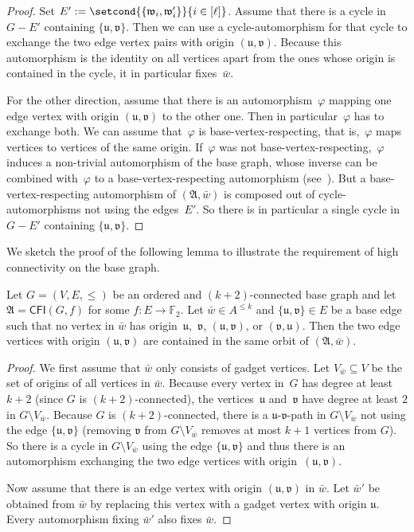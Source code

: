 \documentclass[]{lmcs}
\renewcommand{\phi}{\varphi}
\newcommand{\FF}{\mathbb{F}}
\newcommand{\set}[1]{\lbrace #1 \rbrace}
\newcommand{\autoA}{\phi}
\newcommand{\tup}[1]{\bar{#1}}
\newcommand{\Struct}{\mathfrak{A}}
\newcommand{\vertC}{w}
\newcommand{\StructA}{\mathfrak{A}}
\newcommand{\StructVA}{A}
\newcommand{\CFIsym}{\mathsf{CFI}}
\newcommand{\CFI}[1]{\CFIsym(#1)}
\newcommand{\bVertA}{\mathfrak{u}}
\newcommand{\bVertB}{\mathfrak{v}}
\newcommand{\bVertC}{\mathfrak{w}}
\begin{document}
\begin{proof}
	Set $E' := \setcond{\set{\bVertC_i,\bVertC'_i}}{i \in [\ell]}$.
	Assume that there is a cycle in $G -E'$
	containing $\set{\bVertA,\bVertB}$.
	Then we can use a cycle-automorphism for that cycle
	to exchange the two edge vertex pairs with origin $(\bVertA,\bVertB)$.
	Because this automorphism is the identity on all vertices apart from the ones whose origin is contained in the cycle,
	it in particular fixes~$\tup{\vertC}$.
	
	For the other direction, assume that there is an automorphism~$\autoA$ mapping
	one edge vertex with origin $(\bVertA,\bVertB)$ to the other one.
	Then in particular~$\autoA$ has to exchange both.
	We can assume that~$\autoA$ is base-vertex-respecting,
	that is,~$\autoA$ maps vertices to vertices of the same origin.
	If~$\autoA$ was not base-vertex-respecting,~$\autoA$ induces
	a non-trivial automorphism of the base graph,
	whose inverse can be combined with~$\autoA$ to a base-vertex-respecting automorphism (see~\cite{Pago23}).
	But a base-vertex-respecting automorphism of $(\StructA, \tup{\vertC})$ is composed out of cycle-automorphisms
	not using the edges~$E'$.
	So there is in particular a single cycle in $G -E'$ containing $\set{\bVertA,\bVertB}$.
\end{proof}
We sketch the proof of the following lemma
to illustrate the requirement of high connectivity on the base graph.

\begin{lemC}
	\label{lem:orbits-connectivity}
	Let $G=(V,E,\leq)$ be an ordered and $(k+2)$-connected base graph
	and let $\StructA = \CFI{G, f}$ for some $f\colon E\to \FF_2$.
	Let $\tup{\vertC} \in \StructVA^{\leq k}$ 
	and $\set{\bVertA,\bVertB} \in E$ be a base edge
	such that no vertex in $\tup{\vertC}$ has origin~$\bVertA$,~$\bVertB$, $(\bVertA,\bVertB)$, or $(\bVertB,\bVertA)$.
	Then the two edge vertices with origin $(\bVertA,\bVertB)$ are contained in the same orbit of $(\Struct, \tup{\vertC})$.
\end{lemC}
\begin{proof}
	We first assume that $\tup{\vertC}$ only consists of gadget vertices.	
	Let $V_{\tup{\vertC}} \subseteq V$ be the set of origins of all vertices in $\tup{\vertC}$.
	Because every vertex in~$G$ has degree at least $k+2$
	(since $G$ is $(k+2)$-connected),
	the vertices~$\bVertA$ and~$\bVertB$
	have degree at least $2$ in $G\setminus V_{\tup{\vertC}}$.
	Because $G$ is $(k+2)$-connected, there is a $\bVertA$-$\bVertB$-path in $G\setminus V_{\tup{\vertC}}$ not using the edge $\set{\bVertA,\bVertB}$
	(removing  $\bVertB$ from $G\setminus V_{\tup{\vertC}}$ removes at most $k+1$ vertices from $G$).
	So there is a cycle in $G\setminus V_{\tup{\vertC}}$ using the edge $\set{\bVertA,\bVertB}$ and thus there is
	an automorphism exchanging the two edge vertices with origin~$(\bVertA,\bVertB)$.
	
	Now assume that there is an edge vertex with origin $(\bVertA, \bVertB)$
	in $\tup{\vertC}$.
	Let $\tup{\vertC}'$ be obtained from $\tup{\vertC}$
	by replacing this vertex with a gadget vertex with origin $\bVertA$.
	Every automorphism fixing $\tup{\vertC}'$ also fixes $\tup{\vertC}$.
\end{proof}
\end{document}
